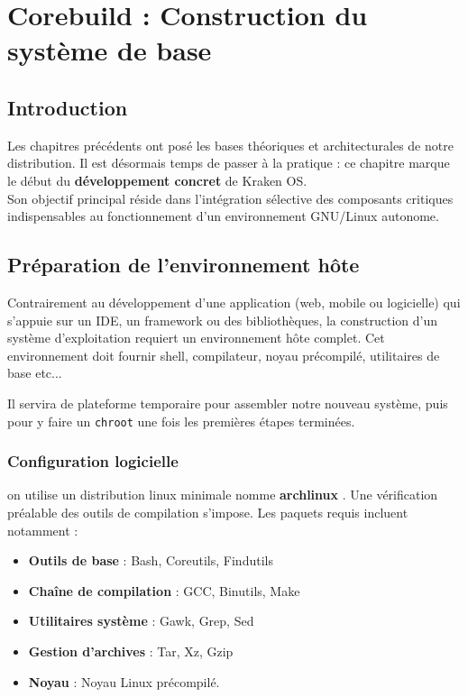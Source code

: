 \chapter{ Corebuild : Construction du système de base}
\label{chap:corebuild}
\minitoc
\clearpage

\section{Introduction}
Les chapitres précédents ont posé les bases théoriques et architecturales de notre distribution. Il est désormais temps de passer à la pratique : ce chapitre marque le début du \textbf{développement concret} de Kraken OS. \\
Son objectif principal réside dans l'intégration sélective des composants critiques indispensables au fonctionnement d'un environnement GNU/Linux autonome.





\section{Préparation de l’environnement hôte}
\label{subsec:env-hote}

Contrairement au développement d’une application (web, mobile ou logicielle) qui s’appuie sur un IDE, un framework ou des bibliothèques, la construction d’un système d’exploitation requiert un environnement hôte complet. Cet environnement doit fournir shell, compilateur, noyau précompilé,
 utilitaires de base  etc...


Il servira de plateforme temporaire pour assembler notre nouveau système, puis pour y faire un \texttt{chroot} une fois les premières étapes terminées.




\subsection{Configuration logicielle}
on utilise un distribution linux minimale nomme \textbf{archlinux} .
Une vérification préalable des outils de compilation s'impose. Les paquets requis incluent notamment :

\begin{itemize}
    \item \textbf{Outils de base} : Bash, Coreutils, Findutils
    \item \textbf{Chaîne de compilation} : GCC, Binutils, Make
    \item \textbf{Utilitaires système} : Gawk, Grep, Sed
    \item \textbf{Gestion d'archives} : Tar, Xz, Gzip
    \item \textbf{Noyau} : Noyau Linux précompilé. 
\end{itemize}

